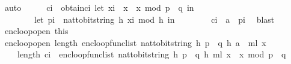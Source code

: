 \begin{isabellebody}
\ auto\isanewline
\ \ \isamarkupfalse%
\ \isamarkupfalse%
\ c{\isacharunderscore}{\kern0pt}i{\isacharprime}{\kern0pt}\ \ obtain{\isacharunderscore}{\kern0pt}c{\isacharunderscore}{\kern0pt}i{\isacharcolon}{\kern0pt}\ {\isachardoublequoteopen}let\ x{\isacharunderscore}{\kern0pt}i\ {\isacharequal}{\kern0pt}\ x{\isacharunderscore}{\kern0pt}{}\ {\isacharasterisk}{\kern0pt}\ x{\isacharunderscore}{\kern0pt}{}\ mod\ {\isacharparenleft}{\kern0pt}p\ {\isacharasterisk}{\kern0pt}\ q{\isacharparenright}{\kern0pt}\ in\isanewline
\ \ \ \ \ \ \ \ let\ p{\isacharunderscore}{\kern0pt}i\ {\isacharequal}{\kern0pt}\ nat{\isacharunderscore}{\kern0pt}to{\isacharunderscore}{\kern0pt}bitstring\ h\ {\isacharparenleft}{\kern0pt}x{\isacharunderscore}{\kern0pt}i\ mod\ {}{\isacharcircum}{\kern0pt}h{\isacharparenright}{\kern0pt}\ in\isanewline
\ \ \ \ \ \ \ \ c{\isacharunderscore}{\kern0pt}i{\isacharprime}{\kern0pt}\ {\isacharequal}{\kern0pt}\ a\ {\isacharbrackleft}{\kern0pt}{\isasymoplus}{\isacharbrackright}{\kern0pt}\ p{\isacharunderscore}{\kern0pt}i{\isachardoublequoteclose}\ \isamarkupfalse%
\ blast\isanewline
\ \ \isamarkupfalse%
\ enc{\isacharunderscore}{\kern0pt}loop{\isacharunderscore}{\kern0pt}open\ this\ \isamarkupfalse%
\ enc{\isacharunderscore}{\kern0pt}loop{\isacharunderscore}{\kern0pt}open{\isacharcolon}{\kern0pt}\ {\isachardoublequoteopen}length\ {\isacharparenleft}{\kern0pt}enc{\isacharunderscore}{\kern0pt}loop{\isacharunderscore}{\kern0pt}func{\isacharunderscore}{\kern0pt}list\ {\isacharparenleft}{\kern0pt}nat{\isacharunderscore}{\kern0pt}to{\isacharunderscore}{\kern0pt}bitstring\ h{\isacharcomma}{\kern0pt}\ p\ {\isacharasterisk}{\kern0pt}\ q{\isacharcomma}{\kern0pt}\ h{\isacharcomma}{\kern0pt}\ a\ {\isacharhash}{\kern0pt}\ m{\isacharunderscore}{\kern0pt}l{\isacharparenright}{\kern0pt}\ x{\isacharunderscore}{\kern0pt}{}{\isacharparenright}{\kern0pt}\ {\isacharequal}{\kern0pt}\ \isanewline
\ \ \ \ length\ {\isacharparenleft}{\kern0pt}c{\isacharunderscore}{\kern0pt}i{\isacharprime}{\kern0pt}\ {\isacharhash}{\kern0pt}\ enc{\isacharunderscore}{\kern0pt}loop{\isacharunderscore}{\kern0pt}func{\isacharunderscore}{\kern0pt}list\ {\isacharparenleft}{\kern0pt}nat{\isacharunderscore}{\kern0pt}to{\isacharunderscore}{\kern0pt}bitstring\ h{\isacharcomma}{\kern0pt}\ p\ {\isacharasterisk}{\kern0pt}\ q{\isacharcomma}{\kern0pt}\ h{\isacharcomma}{\kern0pt}\ m{\isacharunderscore}{\kern0pt}l{\isacharparenright}{\kern0pt}\ {\isacharparenleft}{\kern0pt}{\isacharparenleft}{\kern0pt}x{\isacharunderscore}{\kern0pt}{}\ {\isacharasterisk}{\kern0pt}\ x{\isacharunderscore}{\kern0pt}{}{\isacharparenright}{\kern0pt}\ mod\ {\isacharparenleft}{\kern0pt}p\ {\isacharasterisk}{\kern0pt}\ q{\isacharparenright}{\kern0pt}{\isacharparenright}{\kern0pt}{\isacharparenright}{\kern0pt}{\isachardoublequoteclose}\ \isanewline

\end{isabellebody}
